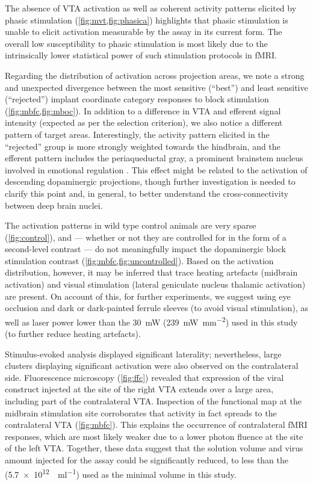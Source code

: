 The absence of VTA activation as well as coherent activity patterns elicited by phasic stimulation (\cref{fig:mvt,fig:phasica}) highlights that phasic stimulation is unable to elicit activation measurable by the assay in its current form.
The overall low susceptibility to phasic stimulation is most likely due to the intrinsically lower statistical power of such stimulation protocols in fMRI.

Regarding the distribution of activation across projection areas, we note a strong and unexpected divergence between the most sensitive (“best”) and least sensitive (“rejected”) implant coordinate category responses to block stimulation (\cref{fig:mbfc,fig:mboc}).
In addition to a difference in VTA and efferent signal intensity (expected as per the selection criterion), we also notice a different pattern of target areas.
Interestingly, the activity pattern elicited in the “rejected” group is more strongly weighted towards the hindbrain, and the efferent pattern includes the periaqueductal gray, a prominent brainstem nucleus involved in emotional regulation \cite{Benarroch2012}.
This effect might be related to the activation of descending dopaminergic projections, though further investigation is needed to clarify this point and, in general, to better understand the cross-connectivity between deep brain nuclei.

The activation patterns in wild type control animals are very sparse (\cref{fig:control}), and --- whether or not they are controlled for in the form of a second-level contrast --- do not meaningfully impact the dopaminergic block stimulation contrast (\cref{fig:mbfc,fig:uncontrolled}).
Based on the activation distribution, however, it may be inferred that trace heating artefacts (midbrain activation) and visual stimulation (lateral geniculate nucleus thalamic activation) are present.
On account of this, for further experiments, we suggest using eye occlusion and dark or dark-painted ferrule sleeves (to avoid visual stimulation), as well as laser power lower than the \SI{30}{\milli\watt} (\SI{239}{\milli\watt\per\milli\meter\squared}) used in this study (to further reduce heating artefacts).

Stimulus-evoked analysis displayed significant laterality; nevertheless, large clusters displaying significant activation were also observed on the contralateral side.
Fluorescence microscopy (\cref{fig:ffc}) revealed that expression of the viral construct injected at the site of the right VTA extends over a large area, including part of the contralateral VTA.
Inspection of the functional map at the midbrain stimulation site corroborates that activity in fact spreads to the contralateral VTA (\cref{fig:mbfc}).
This explains the occurrence of contralateral fMRI responses, which are most likely weaker due to a lower photon fluence at the site of the left VTA.
Together, these data suggest that the solution volume and virus amount injected for the assay could be significantly reduced, to less than the
(\SI{5.7e12}{\vg\per\milli\litre})
used as the minimal volume in this study.

